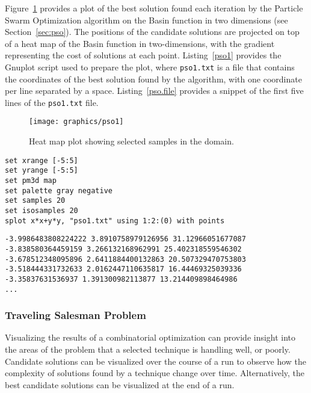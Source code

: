 Figure~\ref{plot:pso1} provides a plot of the best solution found each iteration by the Particle Swarm Optimization algorithm on the Basin function in two dimensions (see Section~\ref{sec:pso}). The positions of the candidate solutions are projected on top of a heat map of the Basin function in two-dimensions, with the gradient representing the cost of solutions at each point.
Listing~\ref{pso1} provides the Gnuplot script used to prepare the plot, where \texttt{pso1.txt} is a file that contains the coordinates of the best solution found by the algorithm, with one coordinate per line separated by a space.
Listing~\ref{pso.file} provides a snippet of the first five lines of the \texttt{pso1.txt} file.

\begin{figure}[ht]
\centering
\texttt{[image: graphics/pso1]}
\caption{Heat map plot showing selected samples in the domain.}
\label{plot:pso1}
\end{figure}

\begin{lstlisting}[caption=Gnuplot script use to create a heat map and selected samples., label=pso1]
set xrange [-5:5]
set yrange [-5:5]
set pm3d map
set palette gray negative
set samples 20
set isosamples 20
splot x*x+y*y, "pso1.txt" using 1:2:(0) with points
\end{lstlisting}

\vspace{1cm}

\begin{lstlisting}[caption=Snippet of the \texttt{pso1.txt} file., label=pso.file]
-3.9986483808224222 3.8910758979126956 31.12966051677087
-3.838580364459159 3.266132168962991 25.402318559546302
-3.678512348095896 2.6411884400132863 20.507329470753803
-3.518444331732633 2.0162447110635817 16.44469325039336
-3.35837631536937 1.391300982113877 13.214409898464986
...
\end{lstlisting}

\subsubsection{Traveling Salesman Problem}
Visualizing the results of a combinatorial optimization can provide insight into the areas of the problem that a selected technique is handling well, or  poorly.
Candidate solutions can be visualized over the course of a run to observe how the complexity of solutions found by a technique change over time. Alternatively, the best candidate solutions can be visualized at the end of a run.

